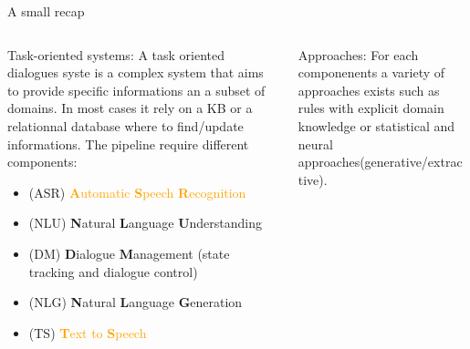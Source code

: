 \documentclass[10pt,aspectratio=169]{beamer}
\begin{document}
\begin{frame}{A small recap}
    \begin{columns}
        \begin{column}{0.6\textwidth}
            \begin{block}{Task-oriented systems: }
                A task oriented dialogues syste is a complex system that aims to provide specific informations an a subset of domains. In most cases it rely on a KB or a relationnal database where to find/update informations. The pipeline require different components:
                \begin{itemize}
                    \item (ASR) \textcolor{orange}{\textbf{A}utomatic \textbf{S}peech \textbf{R}ecognition}
                    \item (NLU) \textbf{N}atural \textbf{L}anguage \textbf{U}nderstanding 
                    \item (DM) \textbf{D}ialogue \textbf{M}anagement (state tracking and dialogue control)
                    \item (NLG) \textbf{N}atural \textbf{L}anguage \textbf{G}eneration
                    \item (TS)  \textcolor{orange}{\textbf{T}ext to \textbf{S}peech}
                \end{itemize}
            \end{block}
        \end{column}
        \begin{column}{0.4\textwidth}
            \begin{block}{Approaches:}
                For each componenents a  variety of approaches exists such as rules with explicit domain knowledge or statistical and neural approaches(generative/extractive).
            \end{block}
        \end{column}
    \end{columns}
\end{frame}
\end{document}
